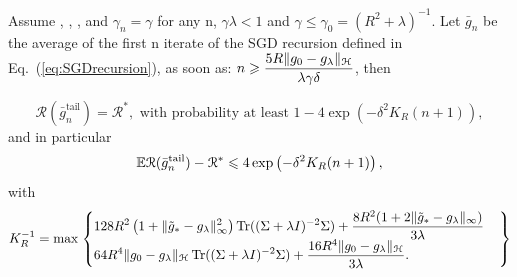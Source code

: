 \begin{theorem}
\label{th:expwithbias}
Assume , , ,  and $\gamma_n = \gamma$ for any n, $\gamma\lambda < 1$ and $\gamma \leqslant \gamma_0 = (R^2 + \lambda)^{-1}$. Let $\bar{g}_n$ be the average of the first n iterate of the SGD recursion defined in Eq.~(\ref{eq:SGDrecursion}), as soon as: $\displaystyle n \geqslant \frac{5R\|g_0- g_\lambda\|_{\mathcal H}}{\lambda\gamma \delta} $, then 

$$ \mathcal{R}(\bar{g}_n^{\textrm {tail}}) = \mathcal{R}^*, \mbox{ with probability at least }1-4\exp\left( - \delta^2 K_R (n+1)\right),$$
and in particular
$$ {\mathbb E}{\mathcal{R}(\bar{g}_n^{\textrm {tail}}) - \mathcal{R}^*} \leqslant 4\exp\left( - \delta^2 K_R (n+1)\right),$$ with \begin{eqnarray*}
K_R^{-1}  = \max \left.
  \begin{cases}
    \displaystyle 128 R^2 \left(1+\|\tilde{g}_*- g_\lambda\|^2_\infty\right)\operatorname{Tr}((\Sigma + \lambda I)^{-2}\Sigma)+\frac{8 R^2 ( 1 + 2 \| \tilde{g}_* - g_\lambda\|_\infty )}{3\lambda}\\
    \displaystyle 64 R^4 \|g_0- g_\lambda\|_{\mathcal H} \operatorname{Tr}((\Sigma + \lambda I)^{-2}\Sigma)+\frac{16 R^4  \| g_0 - g_\lambda\|_{\mathcal H}}{3\lambda}.
  \end{cases}
  \right\}
\end{eqnarray*}
\end{theorem}

